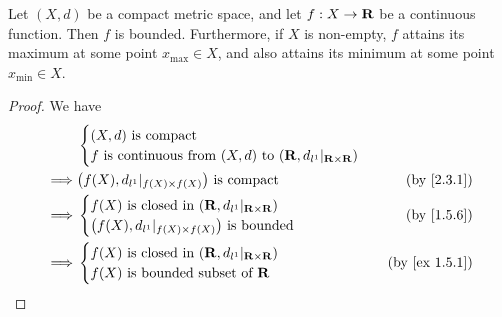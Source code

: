 \begin{proposition}\label{2.3.2}
  Let \((X, d)\) be a compact metric space, and let \(f : X \to \mathbf{R}\) be a continuous function.
  Then \(f\) is bounded.
  Furthermore, if \(X\) is non-empty, \(f\) attains its maximum at some point \(x_{\max} \in X\), and also attains its minimum at some point \(x_{\min} \in X\).
\end{proposition}

\begin{proof}
  We have
  \begin{align*}
             & \begin{cases}
                 (X, d) \text{ is compact} \\
                 f \text{ is continuous from } (X, d) \text{ to } (\R, d_{l^1}|_{\R \times \R})
               \end{cases}                             \\
    \implies & \big(f(X), d_{l^1}|_{f(X) \times f(X)}\big) \text{ is compact}                 & \text{(by \cref{2.3.1})} \\
    \implies & \begin{cases}
                 f(X) \text{ is closed in } (\R, d_{l^1}|_{\R \times \R}) \\
                 \big(f(X), d_{l^1}|_{f(X) \times f(X)}\big) \text{ is bounded}
               \end{cases}                 & \text{(by \cref{1.5.6})}                                             \\
    \implies & \begin{cases}
                 f(X) \text{ is closed in } (\R, d_{l^1}|_{\R \times \R}) \\
                 f(X) \text{ is bounded subset of } \R
               \end{cases}                    & \text{(by \cref{ex 1.5.1})}
  \end{align*}


\end{proof}
